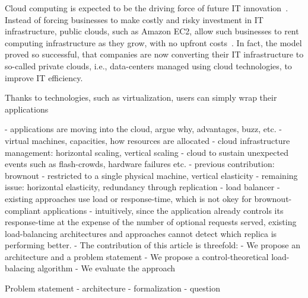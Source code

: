 Cloud computing is expected to be the driving force of future IT innovation~\cite{Gartner}. Instead of forcing businesses to make costly and risky investment in IT infrastructure, public clouds, such as Amazon EC2, allow such businesses to rent computing infrastructure as they grow, with no upfront costs~\cite{Buyya}. In fact, the model proved so successful, that companies are now converting their IT infrastructure to so-called private clouds, i.e., data-centers managed using cloud technologies, to improve IT efficiency.



Thanks to technologies, such as virtualization, users can simply wrap their applications 


- applications are moving into the cloud, argue why, advantages, buzz, etc.
- virtual machines, capacities, how resources are allocated
- cloud infrastructure management: horizontal scaling, vertical scaling
- cloud to sustain unexpected events such as flash-crowds, hardware failures etc.
- previous contribution: brownout
- restricted to a single physical machine, vertical elasticity
- remaining issue: horizontal elasticity, redundancy through replication
- load balancer
- existing approaches use load or response-time, which is not okey for brownout-compliant applications
  - intuitively, since the application already controls its response-time at the expense of the number of optional requests served, existing load-balancing architectures and approaches cannot detect which replica is performing better.
- The contribution of this article is threefold:
  - We propose an architecture and a problem statement
  - We propose a control-theoretical load-balacing algorithm
  - We evaluate the approach

Problem statement
- architecture
- formalization
- question

